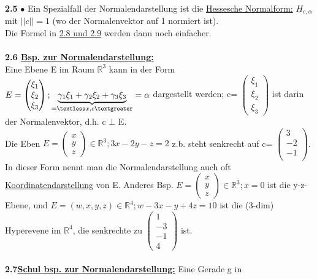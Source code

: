 \documentclass[]{scrartcl}
\begin{document}
\textbf{2.5} $\bullet$ Ein Spezialfall der Normalendarstellung ist die 
\ul{Hessesche Normalform:} $H_{c,\alpha}$ mit \ul{$||c|| = 1$} (wo der 
Normalenvektor auf 1 normiert ist).\\
 Die Formel in  \ul{2.8 und 2.9} werden dann noch einfacher.\\\\
\textbf{ 2.6 \underline{Bsp. zur Normalendarstellung:}}\\ Eine Ebene E im Raum 
$\mathbb{R}^3$ kann in der Form $E = {\begin{pmatrix} 
 		\xi_1\\
 		\xi_2\\
 		\xi_3
 \end{pmatrix}; \underbrace{\gamma_1\xi_1+\gamma_2\xi_2+\gamma_3\xi_3}_{=\textless x,c \textgreater}= \alpha}$ dargestellt werden; c= 
$\begin{pmatrix} 
	\xi_1\\
	\xi_2\\
	\xi_3
\end{pmatrix}$ ist darin der Normalenvektor, d.h. c $\bot$ E.\\
Die Eben $E = {\begin{pmatrix} 
		x\\
		y\\
		z
\end{pmatrix}\in \mathbb{R}^3; 3x-2y-z=2}$ z.b. steht senkrecht auf c= $\begin{pmatrix} 
3\\
-2\\
-1\\
\end{pmatrix}$.\\
In dieser Form nennt man die Normalendarstellung auch oft \ul{Koordinatendarstellung} von E. Anderes Bsp.  $E = {\begin{pmatrix} 
		x\\
		y\\
		z
	\end{pmatrix}\in \mathbb{R}^3; x=0}$ ist die y-z-Ebene, und  $E = {(w,x,y,z)\in \mathbb{R}^4; w-3x-y+4z=10}$ ist die (3-dim) Hyperevene im $\mathbb{R}^4$, die senkrechte zu $\begin{pmatrix}
	1\\
	-3\\
	-1\\
	4
\end{pmatrix}$ ist.\\
\\
\textbf{2.7\underline{Schul bsp. zur Normalendarstellung:}} Eine Gerade g in 
\end{document}
